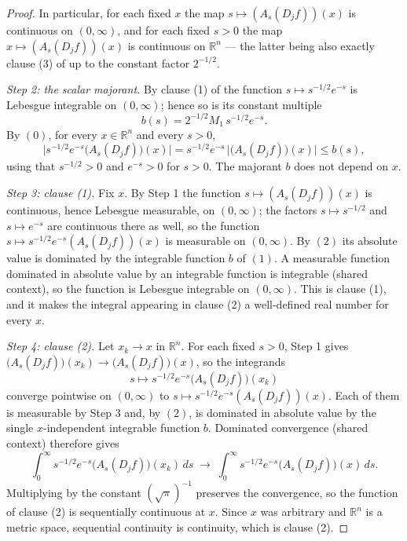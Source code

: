 \begin{proof}
In particular, for each fixed $x$ the map $s \mapsto (A_s(D_jf))(x)$ is
continuous on $(0,\infty)$, and for each fixed $s>0$ the map
$x \mapsto (A_s(D_jf))(x)$ is continuous on $\mathbb{R}^n$ --- the latter being
also exactly clause (3) of  up to the constant
factor $2^{-1/2}$.

\emph{Step 2: the scalar majorant.}
By clause (1) of  the function
$s \mapsto s^{-1/2}e^{-s}$ is Lebesgue integrable on $(0,\infty)$; hence so is
its constant multiple
\begin{equation*}
  b(s) = 2^{-1/2}M_1\,s^{-1/2}e^{-s} . \tag{1}
\end{equation*}
By $(0)$, for every $x \in \mathbb{R}^n$ and every $s > 0$,
\begin{equation*}
  \bigl|s^{-1/2}e^{-s}\bigl(A_s(D_jf)\bigr)(x)\bigr|
    = s^{-1/2}e^{-s}\,\bigl|\bigl(A_s(D_jf)\bigr)(x)\bigr|
    \leq b(s) , \tag{2}
\end{equation*}
using that $s^{-1/2} > 0$ and $e^{-s} > 0$ for $s>0$.  The majorant $b$ does not
depend on $x$.

\emph{Step 3: clause (1).}
Fix $x$.  By Step 1 the function $s \mapsto (A_s(D_jf))(x)$ is continuous, hence
Lebesgue measurable, on $(0,\infty)$; the factors $s \mapsto s^{-1/2}$ and
$s \mapsto e^{-s}$ are continuous there as well, so the function
$s \mapsto s^{-1/2}e^{-s}(A_s(D_jf))(x)$ is measurable on $(0,\infty)$.  By
$(2)$ its absolute value is dominated by the integrable function $b$ of $(1)$.
A measurable function dominated in absolute value by an integrable function is
integrable (shared context), so the function is Lebesgue integrable on
$(0,\infty)$.  This is clause (1), and it makes the integral appearing in
clause (2) a well-defined real number for every $x$.

\emph{Step 4: clause (2).}
Let $x_k \to x$ in $\mathbb{R}^n$.  For each fixed $s>0$, Step 1 gives
$\bigl(A_s(D_jf)\bigr)(x_k) \to \bigl(A_s(D_jf)\bigr)(x)$, so the integrands
\[
  s \longmapsto s^{-1/2}e^{-s}\bigl(A_s(D_jf)\bigr)(x_k)
\]
converge pointwise on $(0,\infty)$ to
$s \mapsto s^{-1/2}e^{-s}(A_s(D_jf))(x)$.  Each of them is measurable by Step 3
and, by $(2)$, is dominated in absolute value by the single $x$-independent
integrable function $b$.  Dominated convergence (shared context) therefore gives
\[
  \int_0^\infty s^{-1/2}e^{-s}\bigl(A_s(D_jf)\bigr)(x_k)\,ds
    \;\longrightarrow\;
  \int_0^\infty s^{-1/2}e^{-s}\bigl(A_s(D_jf)\bigr)(x)\,ds .
\]
Multiplying by the constant $(\sqrt\pi)^{-1}$ preserves the convergence, so the
function of clause (2) is sequentially continuous at $x$.  Since $x$ was
arbitrary and $\mathbb{R}^n$ is a metric space, sequential continuity is
continuity, which is clause (2).
\end{proof}
